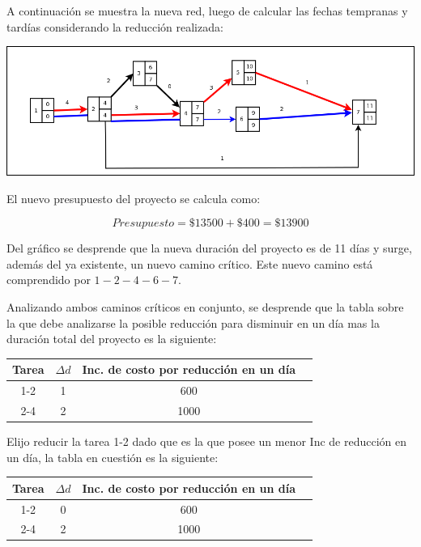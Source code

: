 \documentclass[a4paper,10pt]{article}
\begin{document}
A continuaci\'on se muestra la nueva red, luego de calcular las fechas tempranas y tard\'ias considerando la reducci\'on realizada:

  \begin{center}
    \includegraphics[scale=0.4,keepaspectratio=true]{img/ej5-1red.png} 
  \end{center}

El nuevo presupuesto del proyecto se calcula como:

$$ Presupuesto = \$13500 + \$400 = \$13900 $$

Del gr\'afico se desprende que la nueva duraci\'on del proyecto es de 11 d\'ias y surge, adem\'as del ya existente, un nuevo camino cr\'itico. Este nuevo camino est\'a
comprendido por $1-2-4-6-7$.

Analizando ambos caminos cr\'iticos en conjunto, se desprende que la tabla sobre la que debe analizarse la posible reducci\'on para disminuir en un d\'ia mas la duraci\'on total del proyecto es la siguiente:

   \begin{center}
   \begin{tabular}{|| c | c | c | c ||}
   \hline 
      Tarea & $\Delta d$ & Inc. de costo por reducci\'on en un d\'ia \\ \hline \hline
      1-2 & 1 & 600  \\ \hline
      2-4 & 2 & 1000  \\ \hline
   \end{tabular}
   \end{center}

Elijo reducir la tarea 1-2 dado que es la que posee un menor Inc de reducci\'on en un d\'ia, la tabla en cuesti\'on es la siguiente:

   \begin{center}
   \begin{tabular}{|| c | c | c | c ||}
   \hline 
      Tarea & $\Delta d$ & Inc. de costo por reducci\'on en un d\'ia \\ \hline \hline
      1-2 & 0 & 600  \\ \hline
      2-4 & 2 & 1000  \\ \hline
   \end{tabular}
   \end{center}
\end{document}
